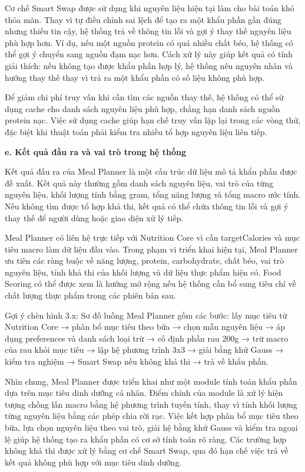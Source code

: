 \documentclass[12pt, a4paper]{report}
\begin{document}
Cơ chế Smart Swap được sử dụng khi nguyên liệu hiện tại làm cho bài toán khó thỏa mãn. Thay vì tự điều chỉnh sai lệch để tạo ra một khẩu phần gần đúng nhưng thiếu tin cậy, hệ thống trả về thông tin lỗi và gợi ý thay thế nguyên liệu phù hợp hơn. Ví dụ, nếu một nguồn protein có quá nhiều chất béo, hệ thống có thể gợi ý chuyển sang nguồn đạm nạc hơn. Cách xử lý này giúp kết quả có tính giải thích: nếu không tạo được khẩu phần hợp lý, hệ thống nêu nguyên nhân và hướng thay thế thay vì trả ra một khẩu phần có số liệu không phù hợp.

Để giảm chi phí truy vấn khi cần tìm các nguồn thay thế, hệ thống có thể sử dụng cache cho danh sách nguyên liệu phù hợp, chẳng hạn danh sách nguồn protein nạc. Việc sử dụng cache giúp hạn chế truy vấn lặp lại trong các vòng thử, đặc biệt khi thuật toán phải kiểm tra nhiều tổ hợp nguyên liệu liên tiếp.

\textbf{e. Kết quả đầu ra và vai trò trong hệ thống}

Kết quả đầu ra của Meal Planner là một cấu trúc dữ liệu mô tả khẩu phần được đề xuất. Kết quả này thường gồm danh sách nguyên liệu, vai trò của từng nguyên liệu, khối lượng tính bằng gram, tổng năng lượng và tổng macro ước tính. Nếu không tìm được tổ hợp khả thi, kết quả có thể chứa thông tin lỗi và gợi ý thay thế để người dùng hoặc giao diện xử lý tiếp.

Meal Planner có liên hệ trực tiếp với Nutrition Core vì cần targetCalories và mục tiêu macro làm dữ liệu đầu vào. Trong phạm vi triển khai hiện tại, Meal Planner ưu tiên các ràng buộc về năng lượng, protein, carbohydrate, chất béo, vai trò nguyên liệu, tính khả thi của khối lượng và dữ liệu thực phẩm hiện có. Food Scoring có thể được xem là hướng mở rộng nếu hệ thống cần bổ sung tiêu chí về chất lượng thực phẩm trong các phiên bản sau.

Gợi ý chèn hình 3.x: Sơ đồ luồng Meal Planner gồm các bước: lấy mục tiêu từ Nutrition Core → phân bổ mục tiêu theo bữa → chọn mẫu nguyên liệu → áp dụng preferences và danh sách loại trừ → cố định phần rau 200g → trừ macro của rau khỏi mục tiêu → lập hệ phương trình 3x3 → giải bằng khử Gauss → kiểm tra nghiệm → Smart Swap nếu không khả thi → trả về khẩu phần.

Nhìn chung, Meal Planner được triển khai như một module tính toán khẩu phần dựa trên mục tiêu dinh dưỡng cá nhân. Điểm chính của module là xử lý hiện tượng chồng lấn macro bằng hệ phương trình tuyến tính, thay vì tính khối lượng từng nguyên liệu bằng các phép chia rời rạc. Việc kết hợp phân bổ mục tiêu theo bữa, lựa chọn nguyên liệu theo vai trò, giải hệ bằng khử Gauss và kiểm tra ngoại lệ giúp hệ thống tạo ra khẩu phần có cơ sở tính toán rõ ràng. Các trường hợp không khả thi được xử lý bằng cơ chế Smart Swap, qua đó hạn chế việc trả về kết quả không phù hợp với mục tiêu dinh dưỡng.
\end{document}
